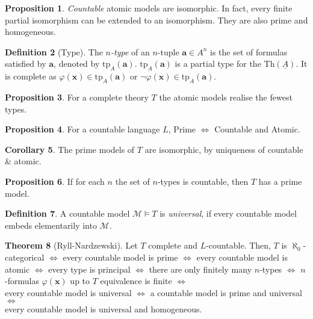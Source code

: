 \documentclass[a4paper,10pt]{article}
\theoremstyle{definition}
\newtheorem{theorem}{Theorem}
\newtheorem{definition}[theorem]{Definition}
\newtheorem{corollary}[theorem]{Corollary}
\newtheorem{proposition}[theorem]{Proposition}
\let\vec\mathbf
\let\phi\varphi
\begin{document}
\begin{proposition} 
    \emph{Countable} atomic models are isomorphic. In fact, every finite partial isomorphism can be extended to an isomorphism. They are also prime and homogeneous.
\end{proposition}

\begin{definition}[Type]
    The \emph{$n$-type} of an $n$-tuple $\vec{a} \in A^n$ is the set of formulas satisfied by $\vec{a}$, denoted by $\mathrm{tp}_A(\vec{a})$. $\mathrm{tp}_A(\vec{a})$ is a partial type for the $\mathrm{Th}(\underline{A})$. It is complete as $\phi(\vec{x}) \in \mathrm{tp}_A(\vec{a})$ or $\neg \phi(\vec{x})\in \mathrm{tp}_A(\vec{a})$.    
\end{definition}

\begin{proposition}
    For a complete theory $T$ the atomic models realise the fewest types.
\end{proposition}

\begin{proposition}
    For a countable language $L$, Prime $\iff$ Countable and Atomic.
\end{proposition}

\begin{corollary}
    The prime models of $T$ are isomorphic, by uniqueness of countable \& atomic.
\end{corollary}

\begin{proposition}
    If for each $n$ the set of $n$-types is countable, then $T$ has a prime model.
\end{proposition}

\begin{definition}
    A countable model $\mathcal{M} \models T$ is \emph{universal}, if every countable model embeds elementarily into $\mathcal{M}$.
\end{definition}

\begin{theorem}[Ryll-Nardzewski]
    Let $T$ complete and $L$-countable. Then, $T$ is $\aleph_0$-categorical $\iff$ every countable model is prime $\iff$ every countable model is atomic $\iff$ every type is principal $\iff$ there are only finitely many $n$-types $\iff$ $n$-formulas $\phi(\vec{x})$ up to $T$ equivalence is finite $\iff$ \\every countable model is universal $\iff$ a countable model is prime and universal $\iff$ \\ every countable model is universal and homogeneous.
\end{theorem}
\end{document}
